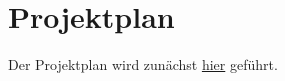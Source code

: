 \chapter{Projektplan}

\begin{comment}
Ein Projektplan wird innerhalb der Projektlaufzeit laufend fortgeführt. Sämtliche Projektaktivitäten werden chronologisch aufgelistet und in Unteraktivitäten gegliedert (mind. drei Gliederungsebenen). Dabei soll zu den Aktivitäten die geplante Zeit gegenüber der tatsächlich verbrauchten Zeit in Stunden angegeben werden. Zudem sollte eine Zuweisung zu den Teammitgliedern erfolgen.
\end{comment}

Der Projektplan wird zunächst \href{run:../EISWS1516_Howe_Projektplan.ods}{hier} geführt.